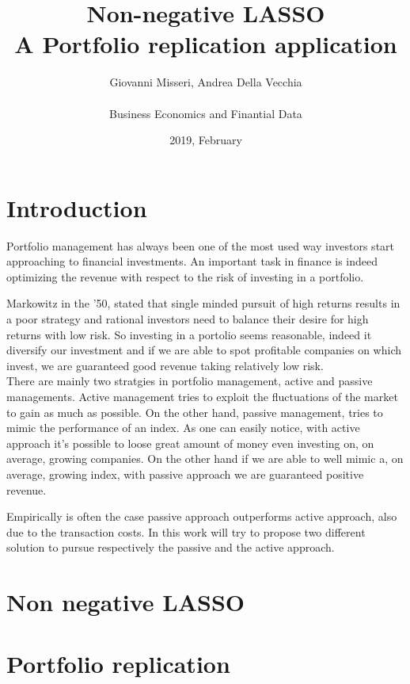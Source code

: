 \documentclass{article}%
\title{%
  Non-negative LASSO \\
  \large A Portfolio replication application}
\date{2019, February}
\author{Giovanni Misseri, Andrea Della Vecchia \\ \\ 
Business Economics and Finantial Data}
\begin{document}
\maketitle
\tableofcontents
\newpage
\section{Introduction}

Portfolio management has always been one of the most used way investors start approaching to financial investments. An important task in finance is indeed optimizing the revenue with respect to the risk of investing in a portfolio.

Markowitz in the '50, stated that single minded pursuit of high returns results in a poor strategy and rational investors need to balance their desire for high returns with low risk. So investing in a portolio seems reasonable, indeed it diversify our investment and if we are able to spot profitable companies on which invest, we are guaranteed good revenue taking relatively low risk.
\\

There are mainly two stratgies in portfolio management, active and passive managements. Active management tries to exploit the fluctuations of the market to gain as much as possible. On the other hand, passive management, tries to mimic the performance of an index. As one can easily notice, with active approach it's possible to loose great amount of money even investing on, on average, growing companies. On the other hand if we are able to well mimic a, on average, growing index, with passive approach we are guaranteed positive revenue.

Empirically is often the case passive approach outperforms active approach, also due to the transaction costs. In this work will try to propose two different solution to pursue respectively the passive and the active approach.

\newpage
\section{Non negative LASSO}

\section{Portfolio replication}
\end{document}
